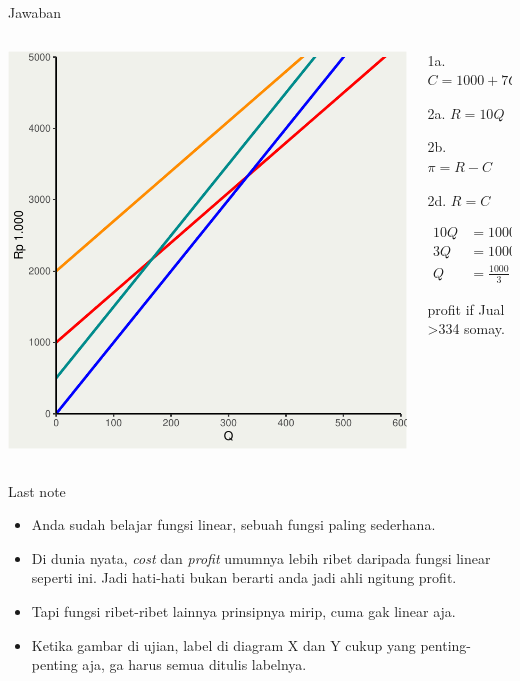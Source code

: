 \documentclass[
  ignorenonframetext,
]{beamer}
\begin{document}
\begin{frame}{Jawaban}
\label{jawaban}
\begin{columns}[T]
\begin{column}{0.47\textwidth}
\includegraphics{index_files/figure-beamer/unnamed-chunk-8-1.pdf}
\end{column}

\begin{column}{0.47\textwidth}
1a. \(C=1000+7Q\)

2a. \(R=10Q\)

2b. \(\pi=R-C\)

2d. \(R=C\)

\[
\begin{align*}
10Q&=1000+7Q \\
3Q&=1000 \\
Q&=\frac{1000}{3}
\end{align*}
\]

profit if Jual \textgreater334 somay.
\end{column}
\end{columns}
\end{frame}

\begin{frame}{Last note}
\label{last-note}
\begin{itemize}
\item
  Anda sudah belajar fungsi linear, sebuah fungsi paling sederhana.
\item
  Di dunia nyata, \emph{cost} dan \emph{profit} umumnya lebih ribet
  daripada fungsi linear seperti ini. Jadi hati-hati bukan berarti anda
  jadi ahli ngitung profit.
\item
  Tapi fungsi ribet-ribet lainnya prinsipnya mirip, cuma gak linear aja.
\item
  Ketika gambar di ujian, label di diagram X dan Y cukup yang
  penting-penting aja, ga harus semua ditulis labelnya.
\end{itemize}
\end{frame}
\end{document}
